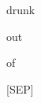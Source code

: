 \documentclass[varwidth=150mm]{standalone}
\begin{document}
\begin{CJK*}{UTF8}{gbsn}
{{{\colorbox{red!2.2948696613311768}{\strut drunk} \colorbox{red!0.0}{\strut out} \colorbox{red!1.299630045890808}{\strut of} \colorbox{red!5.747490882873535}{\strut [SEP]}
}}}
\end{CJK*}
\end{document}
